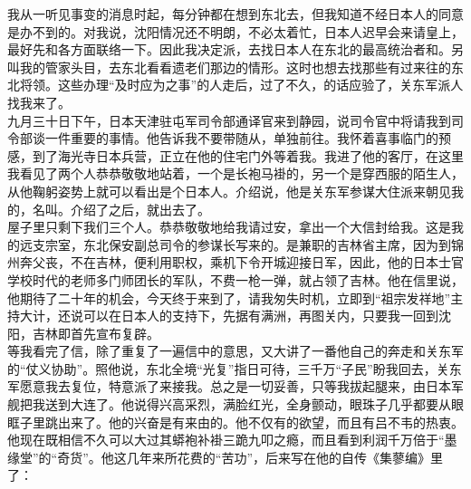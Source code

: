 我从一听见事变的消息时起，每分钟都在想到东北去，但我知道不经日本人的同意是办不到的。对我说，沈阳情况还不明朗，不必太着忙，日本人迟早会来请皇上，最好先和各方面联络一下。因此我决定派，去找日本人在东北的最高统治者和。另叫我的管家头目，去东北看看遗老们那边的情形。这时也想去找那些有过来往的东北将领。这些办理“及时应为之事”的人走后，过了不久，的话应验了，关东军派人找我来了。\\

九月三十日下午，日本天津驻屯军司令部通译官来到静园，说司令官中将请我到司令部谈一件重要的事情。他告诉我不要带随从，单独前往。我怀着喜事临门的预感，到了海光寺日本兵营，正立在他的住宅门外等着我。我进了他的客厅，在这里我看见了两个人恭恭敬敬地站着，一个是长袍马褂的，另一个是穿西服的陌生人，从他鞠躬姿势上就可以看出是个日本人。介绍说，他是关东军参谋大住派来朝见我的，名叫。介绍了之后，就出去了。\\

屋子里只剩下我们三个人。恭恭敬敬地给我请过安，拿出一个大信封给我。这是我的远支宗室，东北保安副总司令的参谋长写来的。是兼职的吉林省主席，因为到锦州奔父丧，不在吉林，便利用职权，乘机下令开城迎接日军，因此，他的日本士官学校时代的老师多门师团长的军队，不费一枪一弹，就占领了吉林。他在信里说，他期待了二十年的机会，今天终于来到了，请我匆失时机，立即到“祖宗发祥地”主持大计，还说可以在日本人的支持下，先据有满洲，再图关内，只要我一回到沈阳，吉林即首先宣布复辟。\\

等我看完了信，除了重复了一遍信中的意思，又大讲了一番他自己的奔走和关东军的“仗义协助”。照他说，东北全境“光复”指日可待，三千万“子民”盼我回去，关东军愿意我去复位，特意派了来接我。总之是一切妥善，只等我拔起腿来，由日本军舰把我送到大连了。他说得兴高采烈，满脸红光，全身颤动，眼珠子几乎都要从眼眶子里跳出来了。他的兴奋是有来由的。他不仅有的欲望，而且有吕不韦的热衷。他现在既相信不久可以大过其蟒袍补褂三跪九叩之瘾，而且看到利润千万倍于“墨缘堂”的“奇货”。他这几年来所花费的“苦功”，后来写在他的自传《集蓼编》里了：\\

